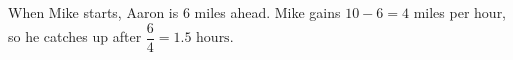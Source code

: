 When Mike starts, Aaron is $6$ miles ahead. Mike gains $10-6=4$ miles per hour, so he catches up after $\dfrac64=\boxed{1.5\text{ hours}}$.
